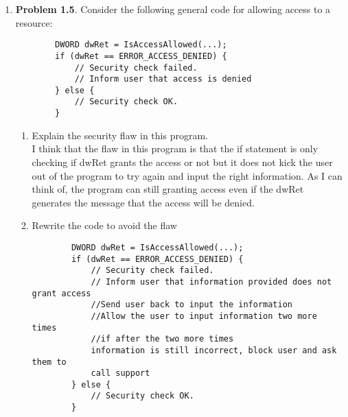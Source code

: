 \documentclass[12pt]{article}
\begin{document}
\begin{enumerate}
\begin{enumerate}
	\end{enumerate}
	\vspace{40pt}
	
	
	\item {\textbf{Problem 1.5}. Consider the following general code for allowing access to a resource: } \\
	
	\begin{verbatim}
		DWORD dwRet = IsAccessAllowed(...);
		if (dwRet == ERROR_ACCESS_DENIED) {
		    // Security check failed.
		    // Inform user that access is denied
		} else {
		    // Security check OK.
		}
	\end{verbatim}
	
	\begin{enumerate}
		\item{Explain the security flaw in this program.} \\ I think that the flaw in this program is that the if statement is only checking if dwRet grants the access or not but it does not kick the user out of the program to try again and input the right information. As I can think of, the program can still granting access even if the dwRet generates the message that the access will be denied. 	
		
		\item{Rewrite the code to avoid the flaw} \\
		\begin{verbatim}
		DWORD dwRet = IsAccessAllowed(...);
		if (dwRet == ERROR_ACCESS_DENIED) {
		    // Security check failed.
		    // Inform user that information provided does not grant access
		    //Send user back to input the information
		    //Allow the user to input information two more times
		    //if after the two more times 
		    information is still incorrect, block user and ask them to 
		    call support
		} else {
		    // Security check OK.
		}
	\end{verbatim}

	
		
	\end{enumerate}
	\vspace{40pt}
	

    
\end{enumerate}
\end{document}
